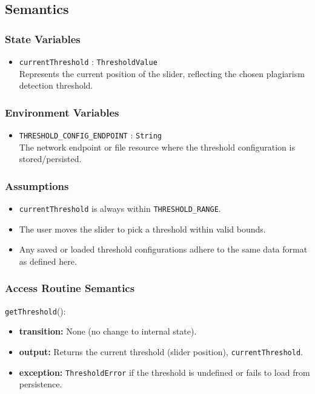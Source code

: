 \documentclass[12pt, titlepage]{article}
\begin{document}
\subsection{Semantics}

\subsubsection{State Variables}

\begin{itemize}
    \item \texttt{currentThreshold} : \texttt{ThresholdValue} \\
    Represents the current position of the slider, reflecting the chosen plagiarism detection threshold.
\end{itemize}

\subsubsection{Environment Variables}

\begin{itemize}
    \item \texttt{THRESHOLD\_CONFIG\_ENDPOINT} : \texttt{String} \\
    The network endpoint or file resource where the threshold configuration is stored/persisted.
\end{itemize}

\subsubsection{Assumptions}

\begin{itemize}
    \item \texttt{currentThreshold} is always within \texttt{THRESHOLD\_RANGE}.
    \item The user moves the slider to pick a threshold within valid bounds.
    \item Any saved or loaded threshold configurations adhere to the same data format as defined here.
\end{itemize}

\subsubsection{Access Routine Semantics}

\noindent \texttt{getThreshold}():
\begin{itemize}
    \item \textbf{transition:} None (no change to internal state).
    \item \textbf{output:} Returns the current threshold (slider position), \texttt{currentThreshold}.
    \item \textbf{exception:} \texttt{ThresholdError} if the threshold is undefined or fails to load from persistence.
\end{itemize}
\end{document}

